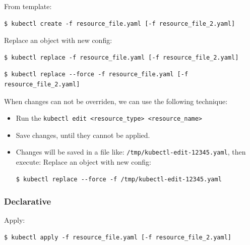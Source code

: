 \documentclass{article}
\newenvironment{blocktemplateI}[1]{%
    \tcolorbox[beamer,%
    noparskip,breakable,
    colframe=Violet,%
    colbacklower=Black,%
    title=#1]}%
    {\endtcolorbox}
\newenvironment{codetemplate}[1][]{%
  \mybasecolorbox[#1]
  \itshape
}{%
  \endmybasecolorbox
}
\begin{document}
From template:
\begin{codetemplate}
\begin{verbatim}
$ kubectl create -f resource_file.yaml [-f resource_file_2.yaml]
\end{verbatim}
\end{codetemplate}

Replace an object with new config:
\begin{codetemplate}
\begin{verbatim}
$ kubectl replace -f resource_file.yaml [-f resource_file_2.yaml]
\end{verbatim}
\end{codetemplate}
\begin{codetemplate}
\begin{verbatim}
$ kubectl replace --force -f resource_file.yaml [-f resource_file_2.yaml]
\end{verbatim}
\end{codetemplate}

\begin{blocktemplateI}{NOTE}
When changes can not be overriden, we can use the following technique:
\begin{itemize}
    \item Run the \verb|kubectl edit <resource_type> <resource_name>|
    \item Save changes, until they cannot be applied.
    \item Changes will be saved in a file like: \verb|/tmp/kubectl-edit-12345.yaml|, then execute:
Replace an object with new config:
\begin{codetemplate}
\begin{verbatim}
$ kubectl replace --force -f /tmp/kubectl-edit-12345.yaml
\end{verbatim}
\end{codetemplate}
\end{itemize}
\end{blocktemplateI}

\subsubsection{Declarative}
Apply:
\begin{codetemplate}
\begin{verbatim}
$ kubectl apply -f resource_file.yaml [-f resource_file_2.yaml]
\end{verbatim}
\end{codetemplate}
\end{document}
